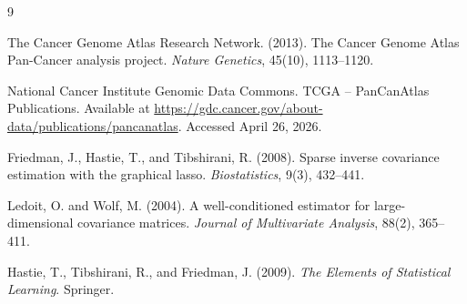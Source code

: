 \documentclass[12pt]{article}
\newcommand{\1}{\mathbf{1}}
\begin{document}
\begin{thebibliography}{9}

The Cancer Genome Atlas Research Network. (2013).
\newblock The Cancer Genome Atlas Pan-Cancer analysis project.
\newblock \emph{Nature Genetics}, 45(10), 1113--1120.

National Cancer Institute Genomic Data Commons.
\newblock TCGA -- PanCanAtlas Publications.
\newblock Available at \url{https://gdc.cancer.gov/about-data/publications/pancanatlas}. Accessed April 26, 2026.

Friedman, J., Hastie, T., and Tibshirani, R. (2008).
\newblock Sparse inverse covariance estimation with the graphical lasso.
\newblock \emph{Biostatistics}, 9(3), 432--441.

Ledoit, O. and Wolf, M. (2004).
\newblock A well-conditioned estimator for large-dimensional covariance matrices.
\newblock \emph{Journal of Multivariate Analysis}, 88(2), 365--411.

Hastie, T., Tibshirani, R., and Friedman, J. (2009).
\newblock \emph{The Elements of Statistical Learning}.
\newblock Springer.

\end{thebibliography}
\end{document}
